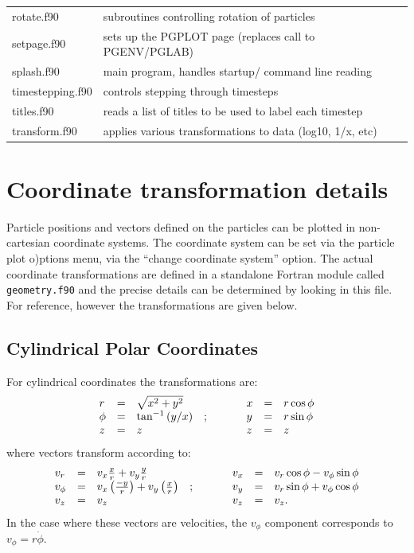 \documentclass[a4paper,11pt]{article}
\begin{document}
\begin{longtable}{|lp{}|}
     rotate.f90             & subroutines controlling rotation of particles\\
     setpage.f90            & sets up the PGPLOT page (replaces call to PGENV/PGLAB)\\
     splash.f90	 & main program, handles startup/ command line reading\\
     timestepping.f90       & controls stepping through timesteps\\
     titles.f90        & reads a list of titles to be used to label each timestep\\
     transform.f90	 	 & applies various transformations to data (log10, 1/x, etc) \\
\end{longtable}

\section{Coordinate transformation details}
\label{sec:coordtransforms}
Particle positions and vectors defined on the particles can be plotted in non-cartesian coordinate
systems. The coordinate system can be set via the particle plot o)ptions menu, via the ``change coordinate
system'' option. The actual coordinate transformations are defined in a standalone Fortran module called
\verb+geometry.f90+ and the precise details can be determined by looking in this file. For reference, however the transformations are given below.

\subsection{ Cylindrical Polar Coordinates}
For cylindrical coordinates the transformations are:
\begin{displaymath}
\begin{array}{lclp{1cm}lcl}
r & = & \sqrt{x^2 + y^2}    & & x & = & r\cos\phi \\
\phi & = & \tan^{-1}{(y/x)} &; & y & = & r\sin\phi \\
z & = & z                             & & z & = & z\\
\end{array}
\end{displaymath}
where vectors transform according to:
\begin{displaymath}
\begin{array}{lclp{1cm}lcl}
v_r      & = & v_x \frac{x}{r} + v_y \frac{y}{r}  & & v_x & = & v_r \cos\phi - v_\phi \sin\phi \\
v_\phi & = & v_x \left(\frac{-y}{r}\right) + v_y \left(\frac{x}{r}\right) &; &v_y & = & v_r \sin\phi + v_\phi \cos\phi \\
v_z      & = & v_z & & v_z & = & v_z. \\
\end{array}
\end{displaymath}
In the case where these vectors are velocities, the $v_{\phi}$ component corresponds to $v_{\phi} = r\dot{\phi}$.
\end{document}
